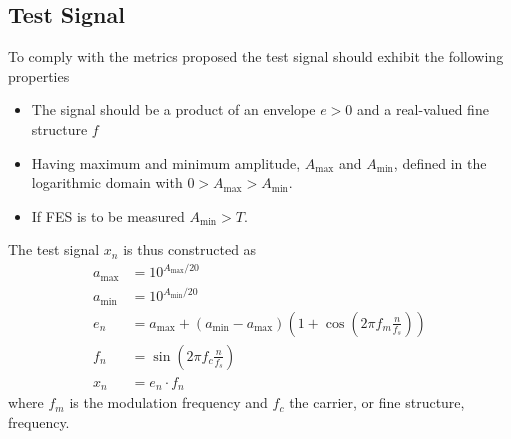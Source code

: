 \documentclass[../main2.tex]{subfiles}
\begin{document}
\subsection{Test Signal} \label{test_signal}
To comply with the metrics proposed the test signal should exhibit the following properties
\begin{itemize}
\item{The signal should be a product of an envelope $e > 0$ and a real-valued fine structure $f$}
\item{Having maximum and minimum amplitude, $A_\text{max}$ and  $A_\text{min}$, defined in the logarithmic domain with $0 > A_\text{max} > A_\text{min}$.}
\item{If FES is to be measured $A_\text{min} > T$.}
\end{itemize}

The test signal $x_n$ is thus constructed as
\begin{align}
a_\text{max} &= 10^{A_\text{max}/20} \\
a_\text{min} &= 10^{A_\text{min}/20} \\
e_n &=  a_\text{max} +  (a_\text{min}  - a_\text{max} )\left(1+\cos \left(2\pi f_m \frac{n}{f_s}\right)\right)\\
f_n &= \sin \left( 2\pi f_c\frac{n}{f_s}\right) \\
x_n &= e_n \cdot f_n \label{eq:eq_test_signal}
\end{align}
where $f_m$ is the modulation frequency and $f_c$ the carrier, or fine structure, frequency.
\end{document}

